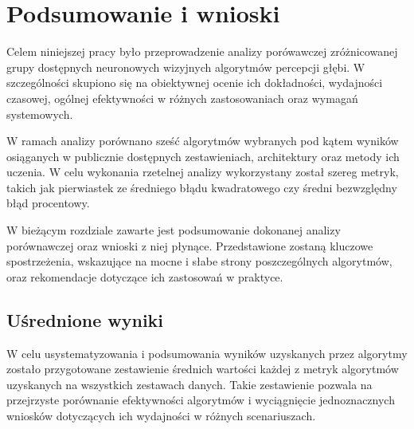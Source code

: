 \chapter{Podsumowanie i wnioski}\label{chap:podsumowanie_i_wnioski}
Celem niniejszej pracy było przeprowadzenie analizy porówawczej zróżnicowanej grupy dostępnych neuronowych wizyjnych algorytmów percepcji głębi. W szczególności skupiono się na obiektywnej ocenie ich dokładności, wydajności czasowej, ogólnej efektywności w różnych zastosowaniach oraz wymagań systemowych.

W ramach analizy porównano sześć algorytmów wybranych pod kątem wyników osiąganych w publicznie dostępnych zestawieniach, architektury oraz metody ich uczenia. W celu wykonania rzetelnej analizy wykorzystany został szereg metryk, takich jak pierwiastek ze średniego błądu kwadratowego czy średni bezwzględny błąd procentowy.

W bieżącym rozdziale zawarte jest podsumowanie dokonanej analizy porównawczej oraz wnioski z niej płynące. Przedstawione zostaną kluczowe spostrzeżenia, wskazujące na mocne i słabe strony poszczególnych algorytmów, oraz rekomendacje dotyczące ich zastosowań w praktyce.

\section{Uśrednione wyniki}
W celu usystematyzowania i podsumowania wyników uzyskanych przez algorytmy zostało przygotowane zestawienie średnich wartości każdej z metryk algorytmów uzyskanych na wszystkich zestawach danych. Takie zestawienie pozwala na przejrzyste porównanie efektywności algorytmów i wyciągnięcie jednoznacznych wniosków dotyczących ich wydajności w różnych scenariuszach.

